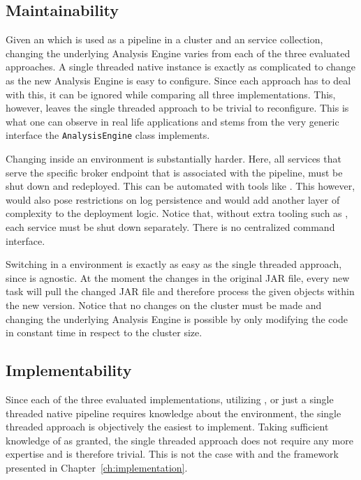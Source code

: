 \subsection{Maintainability}
Given an \anen{} which is used as a pipeline in a \spark{} cluster and an \uimaas{} service collection, changing the underlying Analysis Engine varies from each of the three evaluated approaches. A single threaded native \uima{} instance is exactly as complicated to change as the new Analysis Engine is easy to configure. Since each approach has to deal with this, it can be ignored while comparing all three implementations. This, however, leaves the single threaded approach to be trivial to reconfigure. This is what one can observe in real life applications and stems from the very generic interface the \lstinline|AnalysisEngine| class implements.

Changing \anens{} inside an \uimaas{} environment is substantially harder. Here, all services that serve the specific broker endpoint that is associated with the pipeline, must be shut down and redeployed. This can be automated with tools like \docker{}. This however, would also pose restrictions on log persistence and would add another layer of complexity to the deployment logic. Notice that, without extra tooling such as \docker{}, each service must be shut down separately. There is no centralized command interface.

Switching \anens{} in a \spark{} environment is exactly as easy as the single threaded approach, since \spark{} is \uima{} agnostic. At the moment the \anen{} changes in the original JAR file, every new task \spark{} will pull the changed JAR file and therefore process the given \cas{} objects within the new \anen{} version. Notice that no changes on the cluster must be made and changing the underlying Analysis Engine is possible by only modifying the code in constant time in respect to the cluster size.
\subsection{Implementability}
Since each of the three evaluated implementations, utilizing \spark{}, \uimaas{} or just a single threaded native \uima{} pipeline requires knowledge about the \uima{} environment, the single threaded approach is objectively the easiest to implement. Taking sufficient knowledge of \uima{} as granted, the single threaded approach does not require any more expertise and is therefore trivial. This is not the case with \uimaas{} and the framework presented in Chapter~\ref{ch:implementation}.

